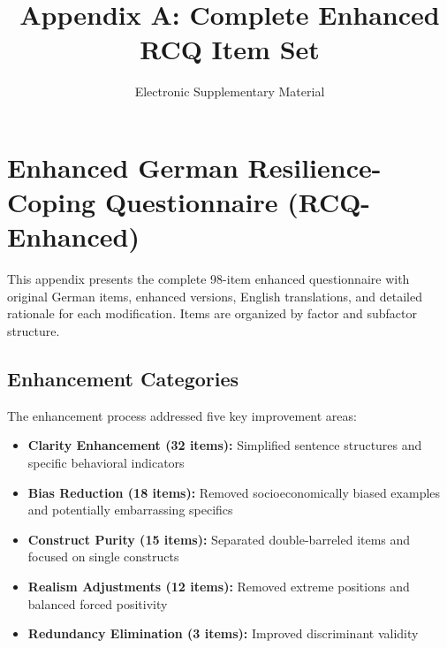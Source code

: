 \documentclass[12pt,a4paper]{article}
\title{Appendix A: Complete Enhanced RCQ Item Set}
\author{Electronic Supplementary Material}
\date{}
\begin{document}
\maketitle

\section*{Enhanced German Resilience-Coping Questionnaire (RCQ-Enhanced)}

This appendix presents the complete 98-item enhanced questionnaire with original German items, enhanced versions, English translations, and detailed rationale for each modification. Items are organized by factor and subfactor structure.

\subsection*{Enhancement Categories}

The enhancement process addressed five key improvement areas:
\begin{itemize}
\item \textbf{Clarity Enhancement (32 items):} Simplified sentence structures and specific behavioral indicators
\item \textbf{Bias Reduction (18 items):} Removed socioeconomically biased examples and potentially embarrassing specifics
\item \textbf{Construct Purity (15 items):} Separated double-barreled items and focused on single constructs
\item \textbf{Realism Adjustments (12 items):} Removed extreme positions and balanced forced positivity
\item \textbf{Redundancy Elimination (3 items):} Improved discriminant validity
\end{itemize}
\end{document}
